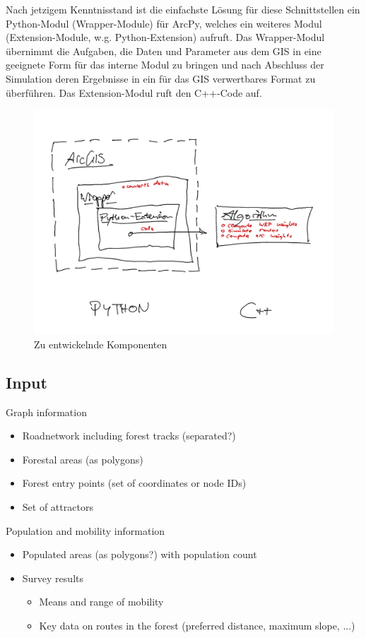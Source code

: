 \documentclass[parskip=half,german]{scrartcl}
\begin{document}
Nach jetzigem Kenntnisstand ist die einfachste Lösung für diese Schnittstellen
ein Python-Modul (Wrapper-Module) für ArcPy, welches ein weiteres Modul
(Extension-Module, w.g. Python-Extension) aufruft. Das Wrapper-Modul
übernimmt die Aufgaben, die Daten und Parameter aus dem GIS in eine geeignete
Form für das interne Modul zu bringen und nach Abschluss der Simulation deren
Ergebnisse in ein für das GIS verwertbares Format zu überführen. Das
Extension-Modul ruft den C++-Code auf.

\begin{figure}
  \includegraphics[width=\textwidth]{UML.png}
  \caption{Zu entwickelnde Komponenten}
\end{figure}

\subsection*{Input}
     Graph information
     \begin{itemize}
      \item Roadnetwork including forest tracks (separated?)
      \item Forestal areas (as polygons)
      \item Forest entry points (set of coordinates or node IDs)
      \item Set of attractors 
     \end{itemize}
     
     Population and mobility information
     \begin{itemize}
      \item Populated areas (as polygons?) with population count
      \item Survey results 
        \begin{itemize}
         \item Means and range of mobility
         \item Key data on routes in the forest (preferred distance, maximum
slope, ...)
        \end{itemize}

     \end{itemize}
\end{document}

